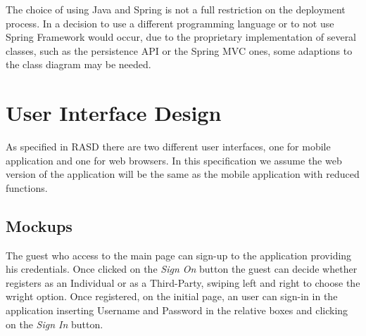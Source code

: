 \documentclass[a4paper]{article}
\begin{document}
The choice of using Java and Spring is not a full restriction on the deployment process. In a decision to use a different programming language or to not use Spring Framework would occur, due to the proprietary implementation of several classes, such as the persistence API or the Spring MVC ones, some adaptions to the class diagram may be needed.

\newpage
\section{User Interface Design}
As specified in RASD there are two different user interfaces, one for mobile application and one for web browsers. In this specification we assume the web version of the application will be the same as the mobile application with reduced functions.

\subsection{Mockups}
The guest who access to the main page can sign-up to the application providing his credentials. Once clicked on the \textit{Sign On} button the guest can decide whether registers as an Individual or as a Third-Party, swiping left and right to choose the wright option. Once registered, on the initial page, an user can sign-in in the application inserting Username and Password in the relative boxes and clicking on the \textit{Sign In} button. 
\end{document}
